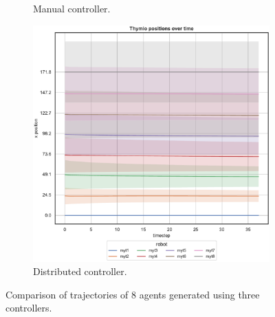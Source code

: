 \begin{figure}[!htb]
\begin{center}
\begin{subfigure}[h]{0.325\textwidth}
			\caption{Manual controller.}
		\end{subfigure}
		\hfill
		\begin{subfigure}[h]{0.325\textwidth}
			\centering
			\includegraphics[width=\textwidth]{contents/images/net-d18/N8/position-overtime-distributed}
			\caption{Distributed controller.}
		\end{subfigure}
	\end{center}
	\caption[Evaluation of the trajectories learned by \texttt{net-d18} using 8 
	agents.]{Comparison of trajectories of 8 agents generated using three 
		controllers.}
	\label{fig:net-d18traj8}
\end{figure}
